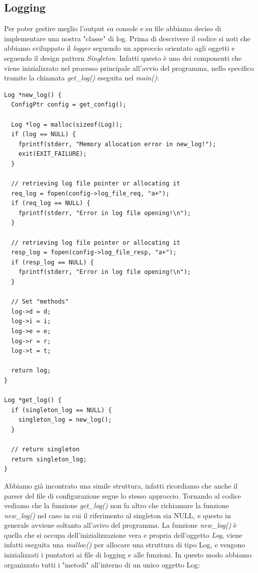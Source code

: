\documentclass[italian]{tktltiki2}
\begin{document}
\subsection{Logging}
\label{ssec:logging}
Per poter gestire meglio l'output su console e su file abbiamo deciso di implementare una nostra "classe" di log. Prima di descrivere il codice si noti che abbiamo sviluppato il \emph{logger} seguendo un approccio orientato agli oggetti e seguendo il design pattern \emph{Singleton}. Infatti questo è uno dei componenti che viene inizializzato nel processo principale all'avvio del programma, nello specifico tramite la chiamata \emph{get\_log()} eseguita nel \emph{main()}:
\begin{lstlisting}
Log *new_log() {
  ConfigPtr config = get_config();

  Log *log = malloc(sizeof(Log));
  if (log == NULL) {
    fprintf(stderr, "Memory allocation error in new_log!");
    exit(EXIT_FAILURE);
  }
  
  // retrieving log file pointer or allocating it
  req_log = fopen(config->log_file_req, "a+");
  if (req_log == NULL) {
    fprintf(stderr, "Error in log file opening!\n");
  }

  // retrieving log file pointer or allocating it
  resp_log = fopen(config->log_file_resp, "a+");
  if (resp_log == NULL) {
    fprintf(stderr, "Error in log file opening!\n");
  }

  // Set "methods"
  log->d = d;
  log->i = i;
  log->e = e;
  log->r = r;
  log->t = t;

  return log;
}

Log *get_log() {
  if (singleton_log == NULL) {
    singleton_log = new_log();
  }

  // return singleton
  return singleton_log;
}
\end{lstlisting}
Abbiamo già incontrato una simile struttura, infatti ricordiamo che anche il parser del file di configurazione segue lo stesso approccio. Tornando al codice vediamo che la funzione \emph{get\_log()} non fa altro che richiamare la funzione \emph{new\_log()} nel caso in cui il riferimento al singleton sia NULL, e questo in generale avviene soltanto all'avivo del programma. La funzione \emph{new\_log()} è quella che si occupa dell'inizializzazione vera e propria dell'oggetto \emph{Log}, viene infatti eseguita una \emph{malloc()} per allocare una struttura di tipo Log, e vengono inizializzati i puntatori ai file di logging e alle funzioni. In questo modo abbiamo organizzato tutti i "metodi" all'interno di un unico oggetto Log:
\end{document}
